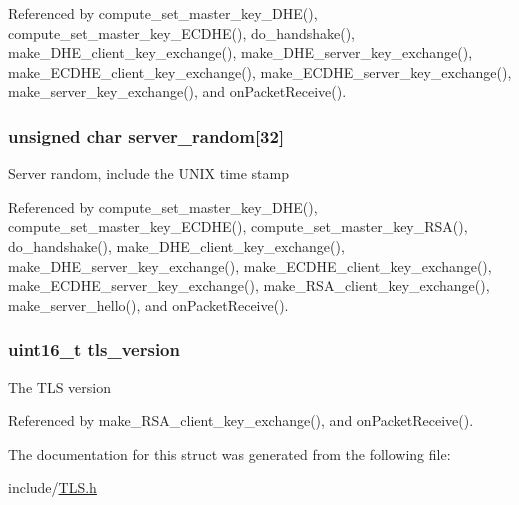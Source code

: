 Referenced by compute\+\_\+set\+\_\+master\+\_\+key\+\_\+\+D\+H\+E(), compute\+\_\+set\+\_\+master\+\_\+key\+\_\+\+E\+C\+D\+H\+E(), do\+\_\+handshake(), make\+\_\+\+D\+H\+E\+\_\+client\+\_\+key\+\_\+exchange(), make\+\_\+\+D\+H\+E\+\_\+server\+\_\+key\+\_\+exchange(), make\+\_\+\+E\+C\+D\+H\+E\+\_\+client\+\_\+key\+\_\+exchange(), make\+\_\+\+E\+C\+D\+H\+E\+\_\+server\+\_\+key\+\_\+exchange(), make\+\_\+server\+\_\+key\+\_\+exchange(), and on\+Packet\+Receive().

\subsubsection[{\texorpdfstring{server\+\_\+random}{server_random}}]{\setlength{\rightskip}{0pt plus 5cm}unsigned char server\+\_\+random\mbox{[}32\mbox{]}}\hypertarget{struct_t_l_s__parameters__t_a9159f146fbc286a8b55f4aa83396ae2f}{}\label{struct_t_l_s__parameters__t_a9159f146fbc286a8b55f4aa83396ae2f}
Server random, include the U\+N\+IX time stamp 

Referenced by compute\+\_\+set\+\_\+master\+\_\+key\+\_\+\+D\+H\+E(), compute\+\_\+set\+\_\+master\+\_\+key\+\_\+\+E\+C\+D\+H\+E(), compute\+\_\+set\+\_\+master\+\_\+key\+\_\+\+R\+S\+A(), do\+\_\+handshake(), make\+\_\+\+D\+H\+E\+\_\+client\+\_\+key\+\_\+exchange(), make\+\_\+\+D\+H\+E\+\_\+server\+\_\+key\+\_\+exchange(), make\+\_\+\+E\+C\+D\+H\+E\+\_\+client\+\_\+key\+\_\+exchange(), make\+\_\+\+E\+C\+D\+H\+E\+\_\+server\+\_\+key\+\_\+exchange(), make\+\_\+\+R\+S\+A\+\_\+client\+\_\+key\+\_\+exchange(), make\+\_\+server\+\_\+hello(), and on\+Packet\+Receive().

\subsubsection[{\texorpdfstring{tls\+\_\+version}{tls_version}}]{\setlength{\rightskip}{0pt plus 5cm}uint16\+\_\+t tls\+\_\+version}\hypertarget{struct_t_l_s__parameters__t_a8fd63193690a09b75e0aaf9b971ed3df}{}\label{struct_t_l_s__parameters__t_a8fd63193690a09b75e0aaf9b971ed3df}
The T\+LS version 

Referenced by make\+\_\+\+R\+S\+A\+\_\+client\+\_\+key\+\_\+exchange(), and on\+Packet\+Receive().



The documentation for this struct was generated from the following file\+:\begin{DoxyCompactItemize}
\item 
include/\hyperlink{_t_l_s_8h}{T\+L\+S.\+h}\end{DoxyCompactItemize}
